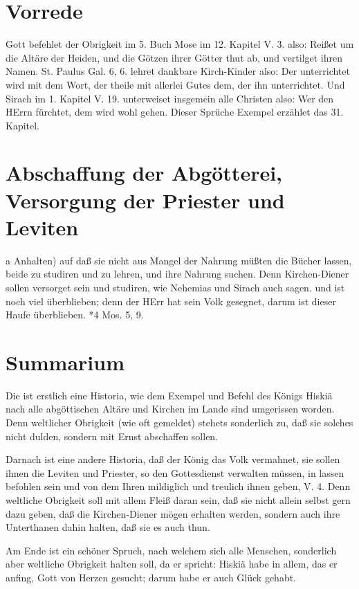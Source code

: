 \section{Vorrede}

Gott befehlet der Obrigkeit im 5. Buch Mose im 12. Kapitel V. 3. also: Reißet um die Altäre der Heiden, und die Götzen ihrer Götter thut ab, und vertilget ihren Namen. St. Paulus Gal. 6, 6. lehret dankbare Kirch-Kinder also: Der unterrichtet wird mit dem Wort, der theile mit allerlei Gutes dem, der ihn unterrichtet. Und Sirach im 1. Kapitel V. 19. unterweiset insgemein alle Christen also: Wer den HErrn fürchtet, dem wird wohl gehen. Dieser Sprüche Exempel erzählet das 31. Kapitel.

\section[Abschaffung der Abgötterei, Versorgung der Priester und Leviten]{Abschaffung der Abgötterei, Versorgung der Priester und Leviten}

a Anhalten) auf daß sie nicht aus Mangel der Nahrung müßten die Bücher lassen, beide zu studiren und zu lehren, und ihre Nahrung suchen. Denn Kirchen-Diener sollen versorget sein und studiren, wie Nehemias und Sirach auch sagen.
und ist noch viel überblieben; denn der HErr hat sein Volk gesegnet, darum ist dieser Haufe überblieben. *4 Mos. 5, 9.

\section{Summarium}

Die ist erstlich eine Historia, wie dem Exempel und Befehl des Königs Hiskiä nach alle abgöttischen Altäre und Kirchen im Lande sind umgerissen worden. Denn weltlicher Obrigkeit (wie oft gemeldet) stehets sonderlich zu, daß sie solches nicht dulden, sondern mit Ernst abschaffen sollen.

Darnach ist eine andere Historia, daß der König das Volk vermahnet, sie sollen ihnen die Leviten und Priester, so den Gottesdienst verwalten müssen, in lassen befohlen sein und von dem Ihren mildiglich und treulich ihnen geben, V. 4. Denn weltliche Obrigkeit soll mit allem Fleiß daran sein, daß sie nicht allein selbst gern dazu geben, daß die Kirchen-Diener mögen erhalten werden, sondern auch ihre Unterthanen dahin halten, daß sie es auch thun.

Am Ende ist ein schöner Spruch, nach welchem sich alle Menschen, sonderlich aber weltliche Obrigkeit halten soll, da er spricht: Hiskiä habe in allem, das er anfing, Gott von Herzen gesucht; darum habe er auch Glück gehabt.

